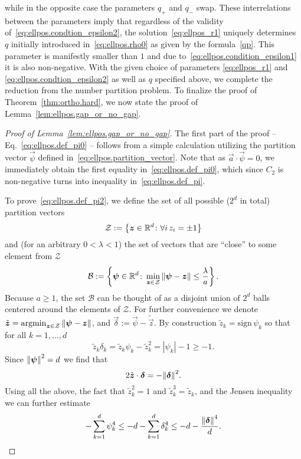 while in the opposite case the parameters $q_{+}$ and $q_{-}$ swap.
These interrelations between the parameters imply that regardless of the validity of~\eqref{eq:ellpos.condtion_epsilon2}, the solution~\eqref{eq:ellpos_r1} uniquely determines  $q$ initially introduced in~\eqref{eq:ellpos.rho0} as given by the formula~\eqref{qp}. This parameter is manifestly smaller than $1$ and due to~\eqref{eq:ellpos.condition_epsilon1} it is also non-negative.
With the given choice of parameters \eqref{eq:ellpos_r1} and \eqref{eq:ellpos.condtion_epsilon2} as well as $q$ specified above, we complete the reduction from the number partition problem.
To finalize the proof of Theorem~\ref{thm:ortho.hard}, we now state the proof of Lemma~\ref{lem:ellpos.gap_or_no_gap}.
\begin{proof}[Proof of Lemma~\ref{lem:ellpos.gap_or_no_gap}]
  The first part of the proof -- Eq.~\eqref{eq:ellpos.def_pi0} --  follows from a simple calculation utilizing the partition vector $\vec\psi$ defined in~\eqref{eq:ellpos.partition_vector}. Note that as $\vec a \cdot\vec \psi=0$, we immediately obtain the first equality in~\eqref{eq:ellpos.def_pi0}, which since $C_2$ is non-negative turns into inequality in~\eqref{eq:ellpos.def_pi}.

  To prove~\eqref{eq:ellpos.def_pi2}, we define the set of all possible ($2^d$ in total) partition vectors
  \[
    \mathcal{Z} := \left\{ {\boldsymbol{z}} \in {\mathbb{R}}^d\colon \forall i \, z_i = \pm 1 \right\}
  \]
  and (for an arbitrary $0<\lambda<1$) the set of vectors that are ``close'' to some element from $\mathcal{Z}$
  \[
    \mathcal{B} := \left\{ {\boldsymbol{\psi}}\in{\mathbb{R}}^d\colon \min_{{\boldsymbol{z}}\in \mathcal{Z}} {\Vert{\boldsymbol{\psi}} - {\boldsymbol{z}}\Vert} \leq \frac{\lambda}{a} \right\}.
  \]
Because $a \geq 1$, the set $\mathcal{B}$ can be thought of as a disjoint union of $2^d$ balls centered around the elements of $\mathcal{Z}$.
For further convenience we denote $\tilde{{\boldsymbol{z}}} = \mathrm{argmin}_{{\boldsymbol{z}}\in\mathcal{Z}} \, {\Vert{\boldsymbol{\psi}} - {\boldsymbol{z}}\Vert}$, and $\vec\delta := \vec\psi - \tilde{\vec{z}}$.
By construction $\tilde{z}_k=\mathrm{sign}\,\psi_k$ so that for all $k=1,\ldots,d$
\[
\tilde{z}_k\delta_k=\tilde{z}_k\psi_k-\tilde{z}_k^2=|\psi_k|-1\geq-1.
\]
Since ${\Vert{\boldsymbol{\psi}}\Vert}^2=d$ we find that
  \[
    2\tilde{{\boldsymbol{z}}} \cdot{\boldsymbol{\delta}} = - {\Vert{\boldsymbol{\delta}}\Vert}^2.
  \]
Using all the above, the fact that $\tilde{z}_k^2=1$ and  $\tilde{z}_k^3=\tilde{z}_k$, and the Jensen inequality we can further estimate
\[
-\sum_{k=1}^d \psi_k^4\leq-d-\sum_{k=1}^d \delta_k^4\leq-d-\frac{{\Vert{\boldsymbol{\delta}}\Vert}^4}{d}.
\]


\end{proof}
